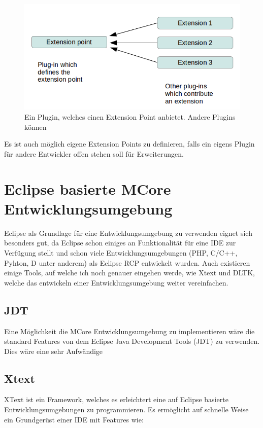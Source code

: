 \begin{figure}[H]
	\centering
		\includegraphics[scale=0.5]{platform/extensionpoint.png}
		\caption{Ein Plugin, welches einen Extension Point anbietet. Andere Plugins können}
		\label{fig:extensionpoint}
\end{figure}

Es ist auch möglich eigene Extension Points zu definieren, falls ein eigens Plugin für andere Entwickler offen stehen soll für Erweiterungen.

\section{Eclipse basierte MCore Entwicklungsumgebung}

Eclipse als Grundlage für eine Entwicklungsumgebung zu verwenden eignet sich besonders gut, da Eclipse schon einiges an Funktionalität für eine IDE zur Verfügung stellt und schon viele Entwicklungsumgebungen (PHP, C/C++, Pyhton, D unter anderem) als Eclipse RCP entwickelt wurden. Auch existieren einige Tools, auf welche ich noch genauer eingehen werde, wie Xtext und DLTK, welche das entwickeln einer Entwicklungsumgebung weiter vereinfachen.

\subsection{JDT}
Eine Möglichkeit die MCore Entwicklungsumgebung zu implementieren wäre die standard Features von dem Eclipse Java Development Tools (JDT) zu verwenden. Dies wäre eine sehr Aufwändige 

\subsection{Xtext}
XText ist ein Framework, welches es erleichtert eine auf Eclipse basierte Entwicklungsumgebungen zu programmieren. Es ermöglicht auf schnelle Weise ein Grundgerüst einer IDE mit Features wie:

